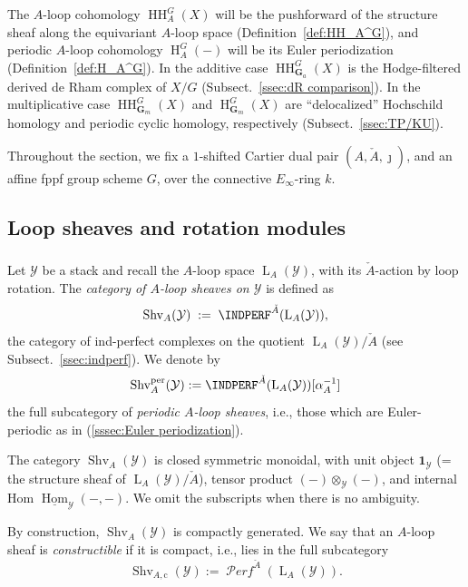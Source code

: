 \documentclass[12pt, oneside]{amsart}
\numberwithin{equation}{section}
\theoremstyle{remark}
\theoremstyle{plain}
\DeclareMathOperator{\PERF}{\mathcal{P}\textit{erf}}
\newcommand{\hhoms}{\underline{\operatorname{Hom}}}
\newcommand{\Loop}{\operatorname{L}}
\newcommand{\YY}{\mathcal{Y}}
\newcommand{\GGa}{\mathbf{G}_{a}}
\newcommand{\GGm}{\mathbf{G}_{m}}
\newcommand{\HH}{\operatorname{HH}}
\newcommand{\Hcoh}{\operatorname{H}}
\newcommand{\Shv}{\operatorname{Shv}}
\newcommand{\Shvper}{\operatorname{Shv}^{\mathrm{per}}}
\newcommand{\un}{\mathbf{1}}
\begin{document}
The $A$-loop cohomology $\HH_A^G(X)$ will be the pushforward of the structure sheaf along the equivariant $A$-loop space (Definition~\ref{def:HH_A^G}), and periodic $A$-loop cohomology $\Hcoh_A^G(-)$ will be its Euler periodization (Definition~\ref{def:H_A^G}).
In the additive case $\HH_{\GGa}^G(X)$ is the Hodge-filtered derived de Rham complex of $X/G$ (Subsect.~\ref{ssec:dR comparison}). In the multiplicative case $\HH_{\GGm}^G(X)$ and $\Hcoh_{\GGm}^G(X)$ are ``delocalized'' Hochschild homology and periodic cyclic homology, respectively (Subsect.~\ref{ssec:TP/KU}).

Throughout the section, we fix a $1$-shifted Cartier dual pair $(A, \check{A}, \jmath)$, and an affine fppf group scheme $G$, over the connective $E_\infty$-ring $k$.

\subsection{Loop sheaves and rotation modules}\label{ssec:sheaves}

\subsubsection{}

Let $\YY$ be a stack and recall the $A$-loop space $\Loop_A(\YY)$, with its $\check{A}$-action by loop rotation.
The \emph{category of $A$-loop sheaves on $\YY$} is defined as
\[
  \Shv_A(\YY) \;:=\; \INDPERF^{\check{A}}(\Loop_A(\YY)),
\]
the category of ind-perfect complexes on the quotient $\Loop_A(\YY)/\check{A}$ (see Subsect.~\ref{ssec:indperf}).
We denote by
\[
  \Shvper_A(\YY) := \INDPERF^{\check{A}}(\Loop_A(\YY))[\alpha_A^{-1}]
\]
the full subcategory of \emph{periodic $A$-loop sheaves}, i.e., those which are Euler-periodic as in (\ref{sssec:Euler periodization}).

The category $\Shv_A(\YY)$ is closed symmetric monoidal, with unit object $\un_\YY$ (= the structure sheaf of $\Loop_A(\YY)/\check{A}$), tensor product $(-) \otimes_{\YY} (-)$, and internal Hom $\hhoms_{\YY}(-, -)$.
We omit the subscripts when there is no ambiguity.

By construction, $\Shv_A(\YY)$ is compactly generated.
We say that an $A$-loop sheaf is \emph{constructible} if it is compact, i.e., lies in the full subcategory
\[
  \Shv_{A,\mathrm{c}}(\YY) := \PERF^{\check{A}}(\Loop_A(\YY)).
\]

\subsubsection{}
\end{document}
